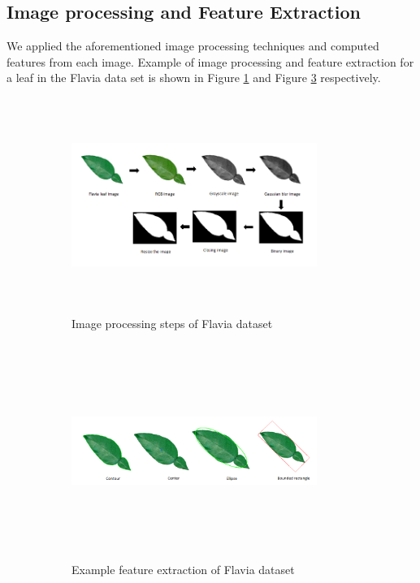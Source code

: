 \documentclass{article}
\begin{document}
\hypertarget{image-processing-and-feature-extraction}{%
\subsection{Image processing and Feature
Extraction}\label{image-processing-and-feature-extraction}}

We applied the aforementioned image processing techniques and computed
features from each image. Example of image processing and feature
extraction for a leaf in the Flavia data set is shown in Figure
\ref{fl5} and Figure \ref{flexe} respectively.

\begin{figure}[!ht]
\begin{subfigure}{.5\textwidth}
\centering
        \includegraphics[width=80mm, height=70mm]{./Figures/fl5.png}
        \caption{\label{fl5}Image processing steps of Flavia dataset}
        
\end{subfigure} 
\begin{subfigure}{.5\textwidth}
\centering
        \includegraphics[width=80mm, height=70mm]{./Figures/fl_example.png}
        \caption{\label{flexe}Example feature extraction of Flavia dataset}
        
\end{subfigure} 

\caption{}
        \end{figure}
\end{document}
